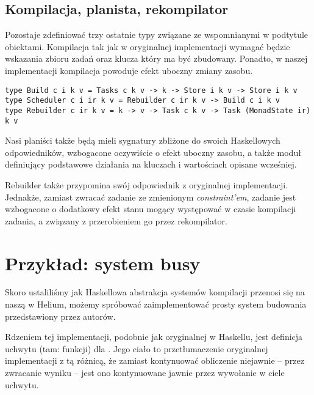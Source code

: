 \subsection{Kompilacja, planista, rekompilator}

Pozostaje zdefiniować trzy ostatnie typy związane ze wspomnianymi w podtytule obiektami. Kompilacja tak jak w oryginalnej implementacji wymagać będzie wskazania zbioru zadań oraz klucza który ma być zbudowany. Ponadto, w  naszej implementacji kompilacja powoduje efekt uboczny zmiany zasobu.

\begin{lstlisting}
type Build c i k v = Tasks c k v -> k -> Store i k v -> Store i k v
type Scheduler c i ir k v = Rebuilder c ir k v -> Build c i k v
type Rebuilder c ir k v = k -> v -> Task c k v -> Task (MonadState ir) k v
\end{lstlisting}

Nasi planiści także będą mieli sygnatury zbliżone do swoich Haskellowych odpowiedników, wzbogacone oczywiście o efekt uboczny zasobu, a także moduł definiujący podstawowe działania na kluczach i wartościach opisane wcześniej.



Rebuilder także przypomina swój odpowiednik z oryginalnej implementacji. Jednakże, zamiast zwracać zadanie ze zmienionym \textit{constraint'em}, zadanie jest wzbogacone o dodatkowy efekt stanu mogący występować w czasie kompilacji zadania, a związany z przerobieniem go przez rekompilator.

\section{Przykład: system busy}

Skoro ustaliliśmy jak Haskellowa abstrakcja systemów kompilacji przenosi się na naszą w Helium, możemy spróbować zaimplementować prosty system budowania  przedstawiony przez autorów.



Rdzeniem tej implementacji, podobnie jak oryginalnej w Haskellu, jest definicja uchwytu (tam: funkcji) dla . Jego ciało to przetłumaczenie oryginalnej implementacji z tą różnicą, że zamiast kontynuować obliczenie niejawnie -- przez zwracanie wyniku -- jest ono kontynuowane jawnie przez wywołanie  w ciele uchwytu.

